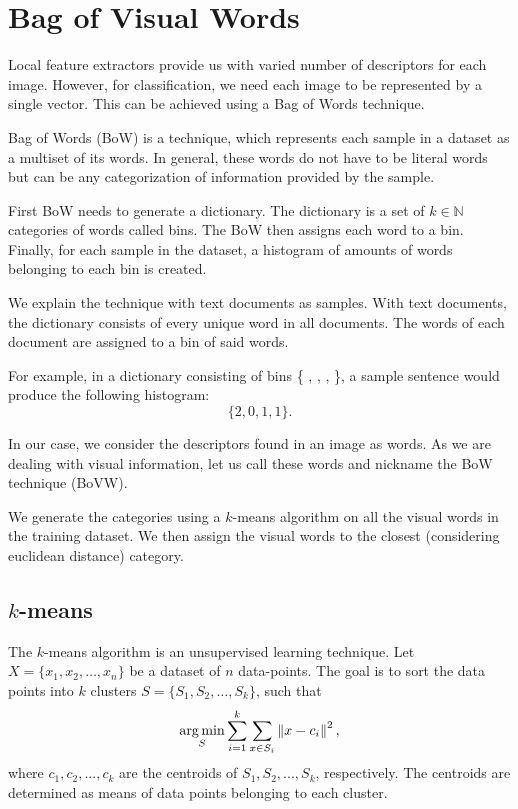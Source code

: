 \section{Bag of Visual Words}
Local feature extractors provide us with varied number of descriptors for each image. However, for classification, we need each image to be represented by a single vector. This can be achieved using a Bag of Words technique.

Bag of Words (BoW) is a technique, which represents each sample in a dataset as a multiset of its words. In general, these words do not have to be literal words but can be any categorization of information provided by the sample.

First BoW needs to generate a dictionary. The dictionary is a set of $k \in \mathbb{N}$ categories of words called bins. The BoW then assigns each word to a bin. Finally, for each sample in the dataset, a histogram of amounts of words belonging to each bin is created.

We explain the technique with text documents as samples. With text documents, the dictionary consists of every unique word in all documents. The words of each document are assigned to a bin of said words.

For example, in a dictionary consisting of bins \{ , , ,  \}, a sample sentence  would produce the following histogram:
\begin{equation}
    \{2, 0, 1, 1\}.
\end{equation}

In our case, we consider the descriptors found in an image as words. As we are dealing with visual information, let us call these words  and nickname the BoW technique  (BoVW).

We generate the categories using a $k$-means algorithm on all the visual words in the training dataset. We then assign the visual words to the closest (considering euclidean distance) category.

\subsection{$k$-means}
The $k$-means algorithm is an unsupervised learning technique. Let $X=\{ x_1, x_2, \dots, x_n \}$ be a dataset of $n$ data-points. The goal is to sort the data points into $k$ clusters $S = \{ S_1, S_2, \dots, S_k \}$, such that
\begin{equation}
    \operatorname*{arg\,min}_S \sum_{i=1}^k \sum_{x\in S_i} \left\lVert x-c_i\right\rVert^2,
\end{equation}
where \(c_1, c_2, ..., c_k \) are the centroids of \(S_1, S_2, ..., S_k \), respectively. The centroids are determined as means of data points belonging to each cluster.

